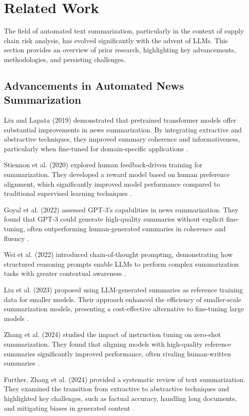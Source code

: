 \section{Related Work}
The field of automated text summarization, particularly in the context of supply chain risk analysis, has evolved significantly with the advent of LLMs. This section provides an overview of prior research, highlighting key advancements, methodologies, and persisting challenges.

\subsection{Advancements in Automated News Summarization}

Liu and Lapata (2019) demonstrated that pretrained transformer models offer substantial improvements in news summarization. By integrating extractive and abstractive techniques, they improved summary coherence and informativeness, particularly when fine-tuned for domain-specific applications \cite{Liu2019}.

Stiennon et al. (2020) explored human feedback-driven training for summarization. They developed a reward model based on human preference alignment, which significantly improved model performance compared to traditional supervised learning techniques \cite{Stiennon2020}.

Goyal et al. (2022) assessed GPT-3's capabilities in news summarization. They found that GPT-3 could generate high-quality summaries without explicit fine-tuning, often outperforming human-generated summaries in coherence and fluency \cite{Goyal2022}.

Wei et al. (2022) introduced chain-of-thought prompting, demonstrating how structured reasoning prompts enable LLMs to perform complex summarization tasks with greater contextual awareness \cite{wei2022chain}.

Liu et al. (2023) proposed using LLM-generated summaries as reference training data for smaller models. Their approach enhanced the efficiency of smaller-scale summarization models, presenting a cost-effective alternative to fine-tuning large models \cite{liu2023learning}.

Zhang et al. (2024) studied the impact of instruction tuning on zero-shot summarization. They found that aligning models with high-quality reference summaries significantly improved performance, often rivaling human-written summaries \cite{zhang2024benchmarking}.

Further, Zhang et al. (2024) provided a systematic review of text summarization. They examined the transition from extractive to abstractive techniques and highlighted key challenges, such as factual accuracy, handling long documents, and mitigating biases in generated content \cite{zhang2024systematic}.

